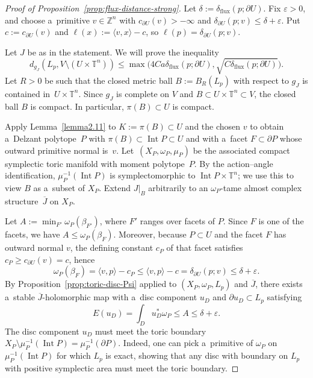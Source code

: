 \documentclass[pdftex]{sigma}
\numberwithin{equation}{section}
\newcommand{\bZ}{{\mathbb Z}}
\newcommand{\bT}{{\mathbb T}}
\theoremstyle{definition}
\begin{document}
\begin{proof}[Proof of Proposition~\ref{prop:flux-distance-strong}]
Let $\delta:=\delta_{\mathrm{flux}}(p;\partial U)$.
Fix $\varepsilon>0$, and choose a~primitive $v\in\bZ^n$ with $c_{\partial U}(v)>-\infty$ and $\delta_{\partial U}(p;v)\le \delta+\varepsilon$.
Put $c:=c_{\partial U}(v)$ and $\ell(x):=\langle v,x\rangle-c$, so $\ell(p)=\delta_{\partial U}(p;v)$.

Let $J$ be as in the statement. We will prove the inequality
\begin{equation}\label{eqPreciseVersion}
 d_{g_J}(L_p, V\setminus (U\times\bT^n)) \le \max\bigl(4Ca\delta_{\mathrm{flux}}(p;\partial U),\sqrt{C\delta_{\mathrm{flux}}(p;\partial U)}\bigr).
\end{equation}
Let $R>0$ be such that the closed metric ball $B:=B_R(L_p)$ with respect to $g_J$ is contained in~${U\times\bT^n}$.
Since $g_J$ is complete on $V$ and $B\subset U\times\bT^n\subset V$, the closed ball $B$ is compact. In particular, $\pi(B)\subset U$ is compact.

Apply Lemma~\ref{lemma2.11} to $K:=\pi(B)\subset U$ and the chosen $v$ to obtain a~Delzant polytope~$P$ with
$
\pi(B)\subset \operatorname{Int} P\subset U
$
and with a~facet $F\subset \partial P$ whose outward primitive normal is~$v$.
Let~${(X_P,\omega_P,\mu_P)}$ be the associated compact symplectic toric manifold with moment polytope~$P$.
By the action--angle identification, $\mu_P^{-1}(\operatorname{Int}P)$ is symplectomorphic to $\operatorname{Int}P\times\bT^n$; we use this to view $B$ as a~subset of $X_P$.
Extend $J|_{B}$ arbitrarily to an $\omega_P$-tame almost complex structure~$\overline{J}$ on $X_P$.

Let $A:=\min_{F'}\omega_P(\beta_{F'})$, where $F'$ ranges over facets of $P$.
Since $F$ is one of the facets, we have $A\le \omega_P(\beta_F)$.
Moreover, because $P\subset U$ and the facet $F$ has outward normal $v$, the defining constant $c_P$ of that facet satisfies $c_P\ge c_{\partial U}(v)=c$, hence
\[
\omega_P(\beta_F)=\langle v,p\rangle-c_P \le \langle v,p\rangle-c = \delta_{\partial U}(p;v) \le \delta+\varepsilon.
\]
By Proposition~\ref{prop:toric-disc-Psi} applied to $(X_P,\omega_P,L_p)$ and $\overline{J}$, there exists a~stable $\overline{J}$-holomorphic map with a~disc component $u_D$ and $\partial u_D\subset L_p$ satisfying
\[
E(u_D)=\int_D u_D^*\omega_P \le A \le \delta+\varepsilon.
\]
The disc component $u_D$ must meet the toric boundary
$
X_P\setminus \mu_P^{-1}(\operatorname{Int}P)=\mu_P^{-1}(\partial P)$.
Indeed, one can pick a~primitive of $\omega_P$ on $\mu_P^{-1}(\operatorname{Int}P)$ for which $L_p$ is exact, showing that any disc with boundary on $L_p$ with positive symplectic area must meet the toric boundary.


\end{proof}
\end{document}
